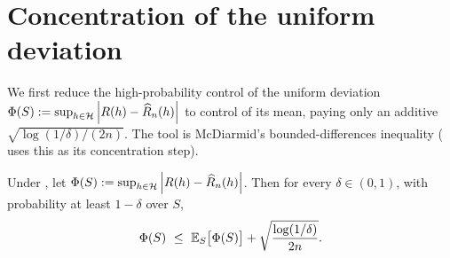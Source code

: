 \section{Concentration of the uniform deviation}\label{sec:mcdiarmid}

We first reduce the high-probability control of the uniform deviation
$\Phi(S):=\sup_{h\in\mathcal{H}}\left| R(h)-\widehat{R}_n(h) \right|$ to control of its mean,
paying only an additive $\sqrt{\log(1/\delta)/(2n)}$. The tool is McDiarmid's
bounded-differences inequality ( uses this as its
concentration step).

\begin{lemma}
\label{lem:mcdiarmid-dev}
Under , let $\Phi(S):=\sup_{h\in\mathcal{H}}\left| R(h)
-\widehat{R}_n(h) \right|$. Then for every $\delta\in(0,1)$, with probability at least
$1-\delta$ over $S$,
\begin{align}\label{eq:mcdiarmid-conc}
\Phi(S)\ \le\ \mathbb{E}_{S}\bigl[\Phi(S)\bigr]
   +\sqrt{\frac{\log(1/\delta)}{2n}}.
\end{align}
\end{lemma}

